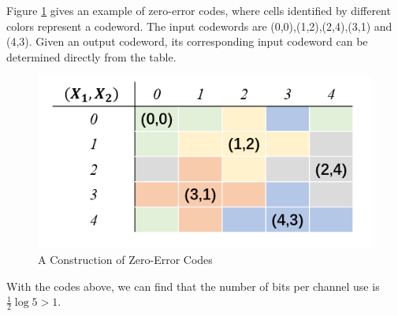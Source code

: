 \begin{exercise}
\begin{solution}
\begin{enumerate}
{      Figure \ref{fig:ex8} gives an example of zero-error codes, where cells identified by different colors represent a codeword. The input codewords are (0,0),(1,2),(2,4),(3,1) and (4,3). Given an output codeword, its corresponding input codeword can be determined directly from the table.
      \begin{figure}[H]
        \centering
        \includegraphics[]{img/6-6.png}
        \caption{A Construction of Zero-Error Codes}
        \label{fig:ex8}
      \end{figure}

      With the codes above, we can find that the number of bits per channel use is $\frac{1}{2} \log{5} > 1$.
    }
  \end{enumerate}
  \end{solution}
  \label{ex8}
\end{exercise}